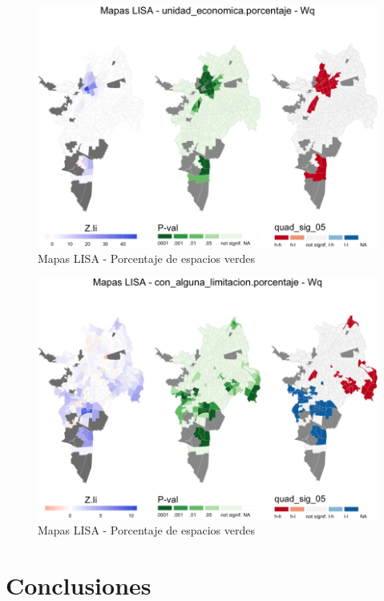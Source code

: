 \documentclass[12pt,]{book}
\begin{document}
\begin{figure}
\includegraphics[width=1\linewidth]{tesis-unigis_files/figure-latex/lisa-areaep-ue-cal-1} \caption{Mapas LISA - Porcentaje de espacios verdes}\label{fig:lisa-areaep-ue-cal1}
\end{figure}\begin{figure}
\includegraphics[width=1\linewidth]{tesis-unigis_files/figure-latex/lisa-areaep-ue-cal-2} \caption{Mapas LISA - Porcentaje de espacios verdes}\label{fig:lisa-areaep-ue-cal2}
\end{figure}

\chapter{Conclusiones}\label{conclusiones}
\end{document}
